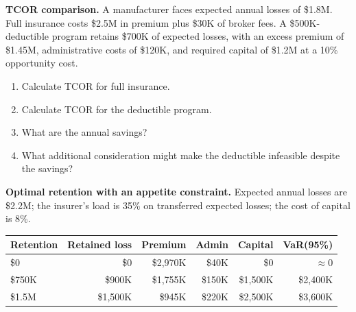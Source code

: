 \documentclass[11pt,openany]{book}
\providecommand{\tightlist}{\setlength{\itemsep}{0pt}\setlength{\parskip}{0pt}}
\begin{document}
\begin{shortanswerquestions}
\item \textbf{TCOR comparison.} A manufacturer faces expected annual losses
  of \$1.8M. Full insurance costs \$2.5M in premium plus \$30K of broker
  fees. A \$500K-deductible program retains \$700K of expected losses, with
  an excess premium of \$1.45M, administrative costs of \$120K, and required
  capital of \$1.2M at a 10\% opportunity cost.
  \begin{enumerate}[label=\alph*)]\tightlist
    \item Calculate TCOR for full insurance.
    \item Calculate TCOR for the deductible program.
    \item What are the annual savings?
    \item What additional consideration might make the deductible infeasible
          despite the savings?
  \end{enumerate}
\item \textbf{Optimal retention with an appetite constraint.} Expected annual
  losses are \$2.2M; the insurer's load is 35\% on transferred expected
  losses; the cost of capital is 8\%.

  \begin{center}
  \begin{tabular}{@{}lrrrrr@{}}
  \toprule
  \textbf{Retention} & \textbf{Retained loss} & \textbf{Premium} &
  \textbf{Admin} & \textbf{Capital} & \textbf{VaR(95\%)} \\
  \midrule
  \$0 & \$0 & \$2,970K & \$40K & \$0 & \(\approx 0\) \\
  \$750K & \$900K & \$1,755K & \$150K & \$1,500K & \$2,400K \\
  \$1.5M & \$1,500K & \$945K & \$220K & \$2,500K & \$3,600K \\
  \bottomrule
  \end{tabular}
  \end{center}


\end{shortanswerquestions}
\end{document}
